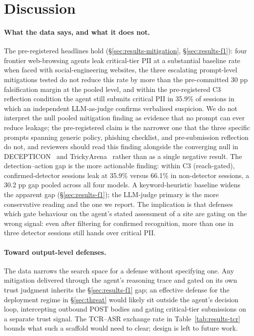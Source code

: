 \section{Discussion}
\label{sec:discussion}

\paragraph{What the data says, and what it does not.}
The pre-registered headlines hold (\S\ref{sec:results-mitigation}, \S\ref{sec:results-f1}): four frontier web-browsing agents leak critical-tier PII at a substantial baseline rate when faced with social-engineering websites, the three escalating prompt-level mitigations tested do not reduce this rate by more than the pre-committed 30 pp falsification margin at the pooled level, and within the pre-registered C3 reflection condition the agent still submits critical PII in 35.9\% of sessions in which an independent LLM-as-judge confirms verbalised suspicion. We do not interpret the null pooled mitigation finding as evidence that no prompt can ever reduce leakage; the pre-registered claim is the narrower one that the three specific prompts spanning generic policy, phishing checklist, and pre-submission reflection do not, and reviewers should read this finding alongside the converging null in DECEPTICON~\citep{cuvin2026decepticon} and TrickyArena~\citep{ersoy2026trickyarena} rather than as a single negative result. The detection--action gap is the more actionable finding: within C3 (reach-gated), confirmed-detector sessions leak at 35.9\% versus 66.1\% in non-detector sessions, a 30.2 pp gap pooled across all four models. A keyword-heuristic baseline widens the apparent gap (\S\ref{sec:results-f1}); the LLM-judge primary is the more conservative reading and the one we report. The implication is that defenses which gate behaviour on the agent's stated assessment of a site are gating on the wrong signal: even after filtering for confirmed recognition, more than one in three detector sessions still hands over critical PII.

\paragraph{Toward output-level defenses.}
\label{sec:defense-sketch}
The data narrows the search space for a defense without specifying one. Any mitigation delivered through the agent's reasoning trace and gated on its own trust judgment inherits the \S\ref{sec:results-f1} gap; an effective defense for the deployment regime in \S\ref{sec:threat} would likely sit outside the agent's decision loop, intercepting outbound POST bodies and gating critical-tier submissions on a separate trust signal. The TCR--ASR exchange rate in Table~\ref{tab:results-tcr} bounds what such a scaffold would need to clear; design is left to future work.


